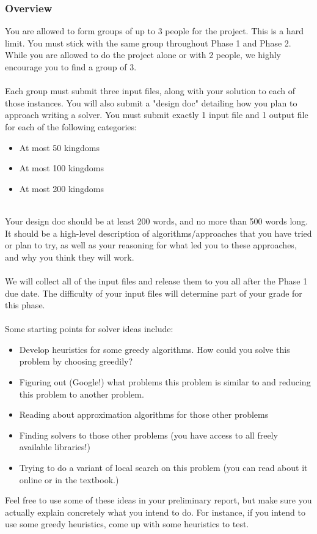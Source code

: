 \documentclass{article}
\begin{document}

\subsubsection*{Overview}
You are allowed to form groups of up to 3 people for the project. This is a hard limit. You must stick with the same group throughout Phase 1 and Phase 2. While you are allowed to do the project alone or with 2 people, we highly encourage you to find a group of 3.
\\ \\
Each group must submit three input files, along with your solution to each of those instances. You will also submit a "design doc" detailing how you plan to approach writing a solver. You must submit exactly 1 input file and 1 output file for each of the following categories:
\begin{itemize}
    \item At most 50 kingdoms
    \item At most 100 kingdoms
    \item At most 200 kingdoms
\end{itemize}
\\
Your design doc should be at least 200 words, and no more than 500 words long. It should be a high-level description of algorithms/approaches that you have tried or plan to try, as well as your reasoning for what led you to these approaches, and why you think they will work.
\\ \\
We will collect all of the input files and release them to you all after the Phase 1 due date. The difficulty of your input files will determine part of your grade for this phase.
\\ \\
Some starting points for solver ideas include:
\begin{itemize}
    \item Develop heuristics for some greedy algorithms. How could you solve this problem by choosing greedily?
    \item Figuring out (Google!) what problems this problem is similar to and reducing this problem to another problem. 
    \item Reading about approximation algorithms for those other problems 
    \item Finding solvers to those other problems (you have access to all freely available libraries!)
    \item Trying to do a variant of local search on this problem (you can read about it online or in the textbook.)
\end{itemize}
Feel free to use some of these ideas in your preliminary report, but make sure you actually explain concretely what you intend to do. For instance, if you intend to use some greedy heuristics, come up with some heuristics to test.
\end{document}
